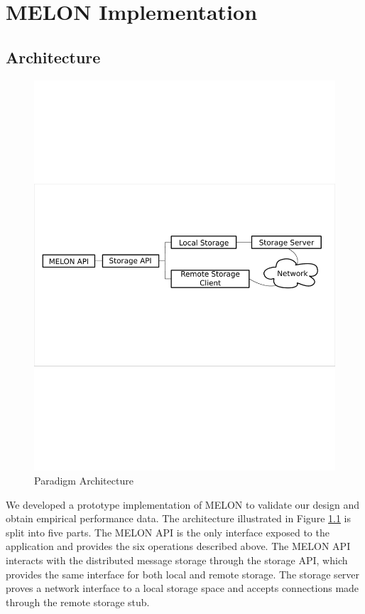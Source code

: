 \chapter{MELON Implementation}

\section{Architecture}

\begin{figure}
\centering
\includegraphics[scale = .70, clip, trim = 10px 280px 10px 250px]{figures/paradigm_arch.pdf}
\caption{Paradigm Architecture}
\label{fig:architecture}
\end{figure}

We developed a prototype implementation of MELON to validate our design and obtain empirical performance data. The architecture illustrated in Figure \ref{fig:architecture} is split into five parts. The MELON API is the only interface exposed to the application and provides the six operations described above. The MELON API interacts with the distributed message storage through the storage API, which provides the same interface for both local and remote storage. The storage server proves a network interface to a local storage space and accepts connections made through the remote storage stub.

